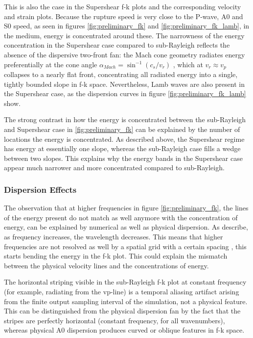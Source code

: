 This is also the case in the Supershear f-k plots and the corresponding velocity and strain plots. Because the rupture speed is very close to the P-wave, A0 and S0 speed, as seen in figures \ref{fig:preliminary_fk} and \ref{fig:preliminary_fk_lamb}, in the medium, energy is concentrated around these. The narrowness of the energy concentration in the Supershear case compared to sub-Rayleigh reflects the absence of the dispersive two-front fan: the Mach cone geometry radiates energy preferentially at the cone angle \(\alpha_{Mach} = \sin^{-1}(c_s/v_r)\) \parencite{dunhamNearsourceGroundMotion2005, rosakisIntersonicShearCracks2002},
which at \(v_r \approx v_p\) collapses to a nearly flat front, concentrating all radiated energy into a single, tightly bounded slope in f-k space. Nevertheless, Lamb waves are also present in the Supershear case, as the dispersion curves in figure \ref{fig:preliminary_fk_lamb} show.  \par

The strong contrast in how the energy is concentrated between the sub-Rayleigh and Supershear case in \ref{fig:preliminary_fk} can be explained by the number of locations the energy is concentrated. As described above, the Supershear regime has energy at essentially
one slope, whereas the sub-Rayleigh case fills a wedge between two slopes. This explains why the energy bands in the Supershear case appear much narrower and more concentrated compared to sub-Rayleigh. \par 

\subsubsection{Dispersion Effects}
The observation that at higher frequencies in figure \ref{fig:preliminary_fk}, the lines of the energy present do not match as well anymore with the concentration of energy, can be explained by numerical as well as physical dispersion. As \cite{komatitschIntroductionSpectralElement1999} describe, as frequency increases, the wavelength decreases. This means that higher frequencies are not resolved as well by a spatial grid with a certain spacing \cite{yilmazSeismicDataAnalysis2001}, this starts bending the energy in the f-k plot. This could explain the mismatch between the physical velocity lines and the concentrations of energy. \par

The horizontal striping visible in the sub-Rayleigh f-k plot at constant frequency (for example, radiating from the vp-line) is a temporal aliasing artifact arising from the finite output sampling interval of the simulation, not a physical feature. This can be distinguished from the physical dispersion fan by the fact that the stripes are perfectly horizontal (constant frequency, for all wavenumbers), whereas physical A0 dispersion produces curved or oblique features in f-k space. \par

